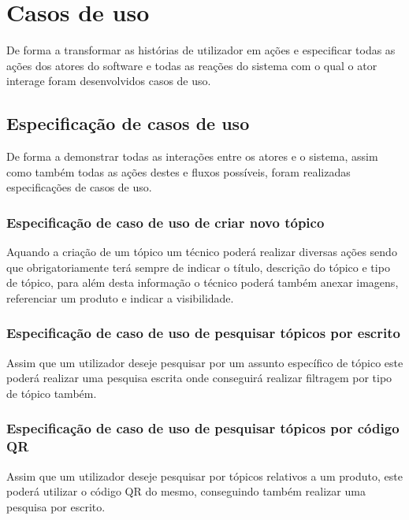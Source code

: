 \section{Casos de uso}
De forma a transformar as histórias de utilizador em ações e especificar todas as ações dos atores do 
software e todas as reações do sistema com o qual o ator interage foram desenvolvidos casos de uso.


\newpage

\subsection{Especificação de casos de uso}

De forma a demonstrar todas as interações entre os atores e o sistema, assim como também todas as ações 
destes e fluxos possíveis, foram realizadas especificações de casos de uso.

\subsubsection{Especificação de caso de uso de criar novo tópico}

Aquando a criação de um tópico um técnico poderá realizar diversas ações sendo que obrigatoriamente 
terá sempre de indicar o título, descrição do tópico e tipo de tópico, para além desta informação o técnico poderá também
anexar imagens, referenciar um produto e indicar a visibilidade.



\subsubsection{Especificação de caso de uso de pesquisar tópicos por escrito}

Assim que um utilizador deseje pesquisar por um assunto específico de tópico este poderá realizar uma 
pesquisa escrita onde conseguirá realizar filtragem por tipo de tópico também.



\newpage

\subsubsection{Especificação de caso de uso de pesquisar tópicos por código QR}

Assim que um utilizador deseje pesquisar por tópicos relativos a um produto, este poderá utilizar 
o código QR do mesmo, conseguindo também realizar uma pesquisa por escrito.    

